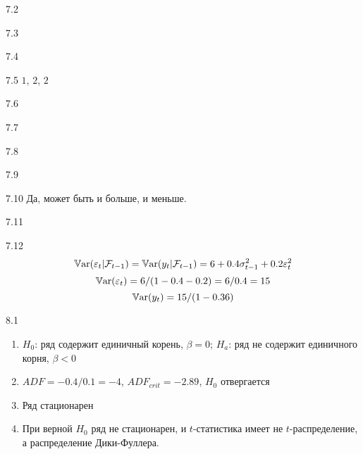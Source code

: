 \protect \hypertarget {soln:7.2}{}
\begin{solution}{{7.2}}

\end{solution}
\protect \hypertarget {soln:7.3}{}
\begin{solution}{{7.3}}

\end{solution}
\protect \hypertarget {soln:7.4}{}
\begin{solution}{{7.4}}

\end{solution}
\protect \hypertarget {soln:7.5}{}
\begin{solution}{{7.5}}
$1$, $2$, $2$
\end{solution}
\protect \hypertarget {soln:7.6}{}
\begin{solution}{{7.6}}
\end{solution}
\protect \hypertarget {soln:7.7}{}
\begin{solution}{{7.7}}
\end{solution}
\protect \hypertarget {soln:7.8}{}
\begin{solution}{{7.8}}
\end{solution}
\protect \hypertarget {soln:7.9}{}
\begin{solution}{{7.9}}
\end{solution}
\protect \hypertarget {soln:7.10}{}
\begin{solution}{{7.10}}
Да, может быть и больше, и меньше.
\end{solution}
\protect \hypertarget {soln:7.11}{}
\begin{solution}{{7.11}}

\end{solution}
\protect \hypertarget {soln:7.12}{}
\begin{solution}{{7.12}}
\[
\operatorname{\mathbb{V}\mathrm{ar}}(\varepsilon_t | \mathcal{F}_{t-1}) = \operatorname{\mathbb{V}\mathrm{ar}}(y_t| \mathcal{F}_{t-1}) = 6 + 0.4 \sigma^2_{t-1} + 0.2\varepsilon_t^2
\]
\[
\operatorname{\mathbb{V}\mathrm{ar}}(\varepsilon_t) = 6/(1-0.4-0.2)=6/0.4=15
\]
\[
\operatorname{\mathbb{V}\mathrm{ar}}(y_t)=15/(1-0.36)
\]
\end{solution}
\protect \hypertarget {soln:8.1}{}
\begin{solution}{{8.1}}

\begin{enumerate}
\item $H_0$: ряд содержит единичный корень, $\beta=0$; $H_a$: ряд не содержит единичного корня, $\beta<0$
\item $ADF=-0.4/0.1=-4$, $ADF_{crit}=-2.89$, $H_0$ отвергается
\item Ряд стационарен
\item При верной $H_0$ ряд не стационарен, и  $t$-статистика имеет не $t$-распределение, а распределение Дики-Фуллера.
\end{enumerate}
\end{solution}
